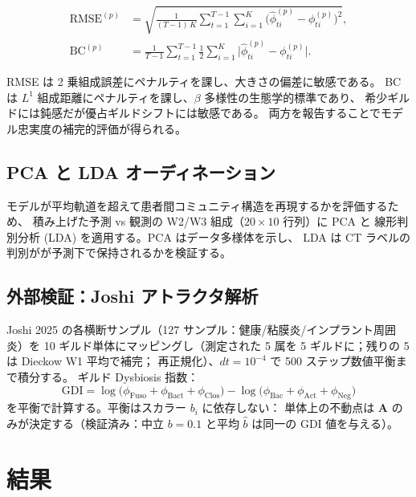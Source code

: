 \documentclass[11pt,a4paper]{article}
\newcommand{\bA}{\mathbf{A}}
\begin{document}
\begin{align}
  \text{RMSE}^{(p)} &= \sqrt{\frac{1}{(T-1)\,K}
    \sum_{t=1}^{T-1}\sum_{i=1}^{K}\bigl(\hat\phi_{ti}^{(p)}-\phi_{ti}^{(p)}\bigr)^2},
  \label{eq:rmse}\\[4pt]
  \text{BC}^{(p)} &= \frac{1}{T-1}\sum_{t=1}^{T-1}
    \frac{1}{2}\sum_{i=1}^{K}\bigl|\hat\phi_{ti}^{(p)}-\phi_{ti}^{(p)}\bigr|.
  \label{eq:bc}
\end{align}

RMSE は 2 乗組成誤差にペナルティを課し、大きさの偏差に敏感である。
BC は $L^1$ 組成距離にペナルティを課し、$\beta$ 多様性の生態学的標準であり、
希少ギルドには鈍感だが優占ギルドシフトには敏感である。
両方を報告することでモデル忠実度の補完的評価が得られる。

\subsection{PCA と LDA オーディネーション}
\label{ssec:ordination}

モデルが平均軌道を超えて患者間コミュニティ構造を再現するかを評価するため、
積み上げた予測 vs 観測の W2/W3 組成（$20 \times 10$ 行列）に PCA と
線形判別分析 (LDA) を適用する。PCA はデータ多様体を示し、
LDA は CT ラベルの判別がが予測下で保持されるかを検証する。

\subsection{外部検証：Joshi アトラクタ解析}
\label{ssec:joshi}

Joshi 2025 の各横断サンプル（127 サンプル：健康/粘膜炎/インプラント周囲炎）を
10 ギルド単体にマッピングし（測定された 5 属を 5 ギルドに；残りの 5 は Dieckow W1 平均で補完；
再正規化）、$dt=10^{-4}$ で 500 ステップ数値平衡まで積分する。
ギルド Dysbiosis 指数：
\begin{equation}
  \text{GDI} = \log\!\bigl(\phi_\text{Fuso}+\phi_\text{Bact}+\phi_\text{Clos}\bigr)
             - \log\!\bigl(\phi_\text{Bac}+\phi_\text{Act}+\phi_\text{Neg}\bigr)
  \label{eq:gdi}
\end{equation}
を平衡で計算する。平衡はスカラー $b_i$ に依存しない：
単体上の不動点は $\bA$ のみが決定する（検証済み：中立 $b=0.1$ と平均 $\hat{b}$ は同一の GDI 値を与える）。

\section{結果}
\label{sec:results}
\end{document}
